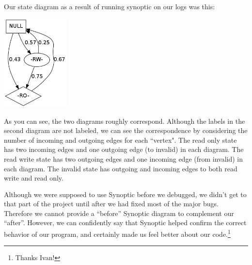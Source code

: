 \documentclass[12pt]{article}	%
\begin{document}
Our state diagram as a result of running synoptic on our logs was this:

\begin{center} \includegraphics[width=130px]{good_synoptic_out.png} \end{center}

As you can see, the two diagrams roughly correspond. Although the labels in the second diagram are not labeled, we can see the correspondence by considering the number of incoming and outgoing edges for each ``vertex". The read only state has two incoming edges and one outgoing edge (to invalid) in each diagram. The read write state has two outgoing edges and one incoming edge (from invalid) in each diagram. The invalid state has outgoing and incoming edges to both read write and read only.

Although we were supposed to use Synoptic before we debugged, we didn't get to that part of the project until after we had fixed most of the major bugs. Therefore we cannot provide a ``before'' Synoptic diagram to complement our ``after''. However, we can confidently say that Synoptic helped confirm the correct behavior of our program, and certainly made us feel better about our code.\footnote{Thanks Ivan!}
\end{document}
